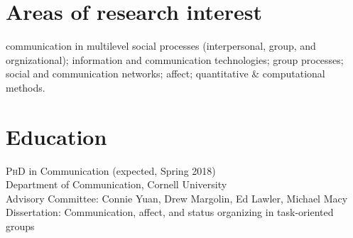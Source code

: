 \documentclass[11pt, letterpaper]{article} %
\newcommand{\years}[1]{\leavevmode\marginnote{\scriptsize #1}} %
\begin{document}

\section*{Areas of research interest}

communication in multilevel social processes (interpersonal, group, and orgnizational); information and communication technologies; group processes; social and communication networks; affect; quantitative \& computational methods. %





\section*{Education}

\years{2012-}\textsc{PhD} in Communication (expected, Spring 2018)\\
    \textsf{
        Department of Communication, Cornell University\\
        Advisory Committee: Connie Yuan, Drew Margolin, Ed Lawler, Michael Macy\\
        Dissertation: Communication, affect, and status organizing in task-oriented groups
            } 
\end{document}
